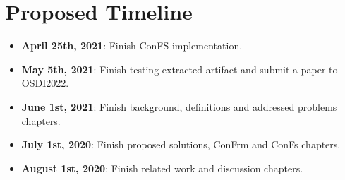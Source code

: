 \section{Proposed Timeline}
\begin{itemize}
	\item \textbf{April 25th, 2021}: Finish ConFS implementation.
	\item \textbf{May 5th, 2021}: Finish testing extracted artifact and submit a paper to OSDI2022.
	\item \textbf{June 1st, 2021}: Finish background, definitions and addressed problems chapters.
	\item \textbf{July 1st, 2020}: Finish proposed solutions, ConFrm and ConFs chapters.
	\item \textbf{August 1st, 2020}: Finish related work and discussion chapters.
\end{itemize}